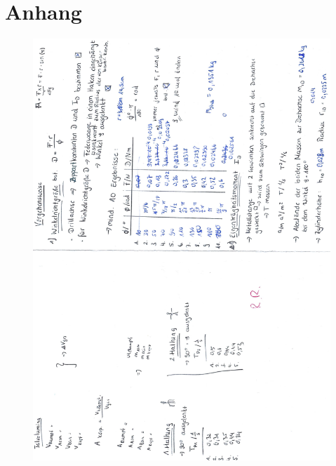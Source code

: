 \section{Anhang}

\begin{flushleft}
    \begin{figure}
        \includegraphics[width = 17cm]{Messdaten/Messdatenanhang1.pdf}
    \end{figure}
    \begin{figure}

\end{figure}
\end{flushleft}
